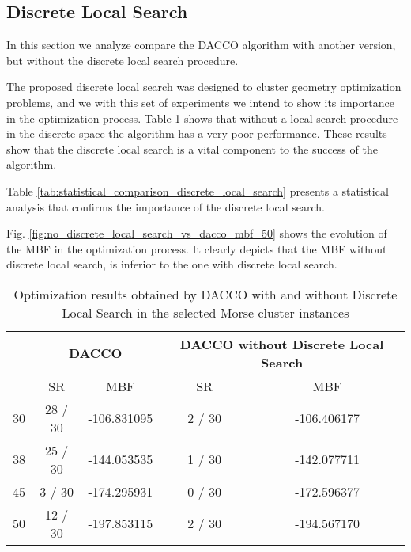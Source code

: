 		\subsection{Discrete Local Search}
		
		In this section we analyze compare the DACCO algorithm with another version, but without the discrete local search procedure. 
		
		The proposed discrete local search was designed to cluster geometry optimization problems, and we with this set of experiments we intend to show its importance in the optimization process.
		Table \ref{tab:discrete_local_search_results} shows that without a local search procedure in the discrete space the algorithm has a very poor performance. These results show that the discrete local search is a vital component to the success of the algorithm. 
		
		Table \ref{tab:statistical_comparison_discrete_local_search} presents a statistical analysis that confirms the importance of the discrete local search. 
		
		Fig. \ref{fig:no_discrete_local_search_vs_dacco_mbf_50} shows the evolution of the MBF in the optimization process. It clearly depicts that the MBF without discrete local search, is inferior to the one with discrete local search.
		
		\begin{table}[!htdp]
				\begin{center}
					\begin{tabular}{| c | c | c | c | c |}
						\hline
						~ & \multicolumn{2}{c|}{\textbf{DACCO}} & \multicolumn{2}{p{4cm}|}{\textbf{DACCO without Discrete Local Search}} \\ \hline
						~ & SR & MBF & SR & MBF \\ \hline
						30 & 28 / 30 & -106.831095 & 2 / 30 & -106.406177 \\ \hline
						38 & 25 / 30 & -144.053535 & 1 / 30 & -142.077711 \\ \hline
						45 & 3 / 30 & -174.295931 & 0 / 30 & -172.596377 \\ \hline
						50 & 12 / 30 & -197.853115 & 2 / 30 & -194.567170 \\ \hline
					\end{tabular}
					\caption{Optimization results obtained by DACCO with and without Discrete Local Search in the selected Morse cluster instances}
					\label{tab:discrete_local_search_results}
				\end{center}
		\end{table}
		
